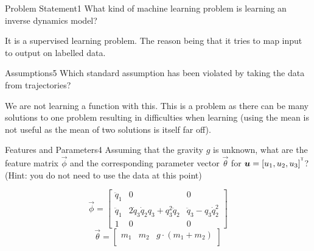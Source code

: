 \begin{questions}


\begin{question}{Problem Statement}{1}
What kind of machine learning problem is learning an inverse dynamics model?

\begin{answer}
	It is a supervised learning problem. The reason being that it tries to map input to output on labelled data.
\end{answer}

\end{question}



\begin{question}{Assumptions}{5}
Which standard assumption has been violated by taking the data from trajectories?

\begin{answer}
	We are not learning a function with this. This is a problem as there can be many solutions to one problem resulting in difficulties when learning (using the mean is not useful as the mean of two solutions is itself far off).
\end{answer}

\end{question}



\begin{question}{Features and Parameters}{4}
Assuming that the gravity $g$ is unknown, what are the feature matrix $\vec{\phi}$ and the corresponding parameter vector $\vec{\theta}$ for ${\boldsymbol{u}}=[u_{1},u_{2},u_{3}]^{^\mathsf{T}}$?
(Hint: you do not need to use the data at this point)

\begin{answer}
$$\vec{\phi}=
\begin{bmatrix}
\ddot{q}_1 & 0 & 0  \\
\ddot{q}_1 & 2\dot{q}_3\dot{q}_2q_3+q_3^2\ddot{q}_2 & \ddot{q}_3-q_3\dot{q}_2^2  \\
1 & 0 & 0 
\end{bmatrix}$$
$$
\vec{\theta}= 
\begin{bmatrix} 
	m_{1} & m_{2} & g \cdot (m_{1}+m_{2})\\
\end{bmatrix}$$
\end{answer}
\end{question}



\end{questions}
